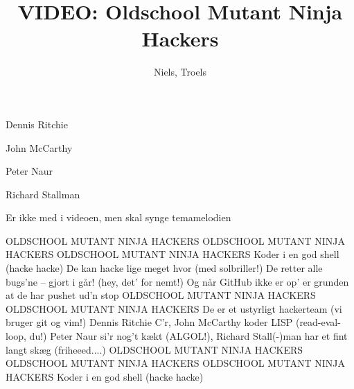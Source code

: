 \documentclass[a4paper,11pt]{article}
\title{VIDEO: Oldschool Mutant Ninja Hackers}
\author{Niels, Troels}
\newcommand{\rolevideo}[1]{\item[\textbf{#1}\hfill]}
\begin{document}
\maketitle

\begin{roles}
\rolevideo{R} Dennis Ritchie
\rolevideo{M} John McCarthy
\rolevideo{N} Peter Naur
\rolevideo{S} Richard Stallman
\rolevideo{Sanger(e)} Er ikke med i videoen, men skal synge temamelodien
\end{roles}

\begin{sketch}





\end{sketch}

\begin{song}
OLDSCHOOL MUTANT NINJA HACKERS
OLDSCHOOL MUTANT NINJA HACKERS
OLDSCHOOL MUTANT NINJA HACKERS
Koder i en god shell (hacke hacke)
De kan hacke lige meget hvor (med solbriller!)
De retter alle bugs'ne -- gjort i går! (hey, det' for nemt!)
Og når GitHub ikke er op'
er grunden at de har pushet ud'n stop
OLDSCHOOL MUTANT NINJA HACKERS
OLDSCHOOL MUTANT NINJA HACKERS
De er et ustyrligt hackerteam (vi bruger git og vim!)
Dennis Ritchie C'r, John McCarthy koder LISP (read-eval-loop, du!)
Peter Naur si'r nog't kækt (ALGOL!), Richard Stall(-)man har et fint langt skæg (friheeed....)
OLDSCHOOL MUTANT NINJA HACKERS
OLDSCHOOL MUTANT NINJA HACKERS
OLDSCHOOL MUTANT NINJA HACKERS
Koder i en god shell (hacke hacke)
\end{song}

\begin{sketch}




\end{sketch}
\end{document}
